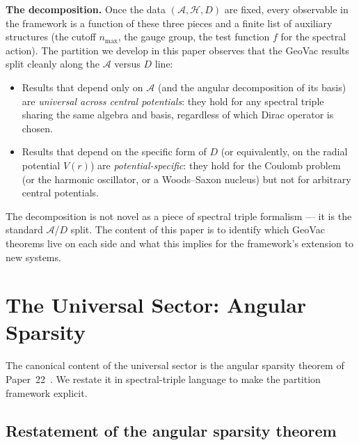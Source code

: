 \documentclass[twocolumn,pra,amsmath,amssymb,superscriptaddress]{revtex4-2}
\begin{document}
\medskip\noindent\textbf{The decomposition.} Once the data
$(\mathcal{A}, \mathcal{H}, D)$ are fixed, every observable in the
framework is a function of these three pieces and a finite list of
auxiliary structures (the cutoff $n_{\max}$, the gauge group, the
test function $f$ for the spectral action).  The partition we develop
in this paper observes that the GeoVac results split cleanly along
the $\mathcal{A}$ versus $D$ line:
\begin{itemize}
\item Results that depend only on $\mathcal{A}$ (and the angular
  decomposition of its basis) are \emph{universal across central
  potentials}: they hold for any spectral triple sharing the same
  algebra and basis, regardless of which Dirac operator is chosen.
\item Results that depend on the specific form of $D$ (or
  equivalently, on the radial potential $V(r)$) are
  \emph{potential-specific}: they hold for the Coulomb problem (or
  the harmonic oscillator, or a Woods--Saxon nucleus) but not for
  arbitrary central potentials.
\end{itemize}
The decomposition is not novel as a piece of spectral triple
formalism --- it is the standard $\mathcal{A}$/$D$ split.  The
content of this paper is to identify which GeoVac theorems live on
each side and what this implies for the framework's extension to new
systems.

\section{The Universal Sector: Angular Sparsity}
\label{sec:universal}

The canonical content of the universal sector is the angular sparsity
theorem of Paper~22~\cite{paper22}.  We restate it in spectral-triple
language to make the partition framework explicit.

\subsection{Restatement of the angular sparsity theorem}
\end{document}
